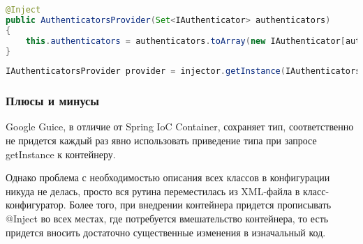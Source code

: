 \begin{lstlisting}[language=Java,caption={Конструктор класса AuthenticatorsProvider}]
@Inject
public AuthenticatorsProvider(Set<IAuthenticator> authenticators)
{
    this.authenticators = authenticators.toArray(new IAuthenticator[authenticators.size()]);
}
\end{lstlisting}

\begin{lstlisting}[language=Java,caption={Место получения экземпляра}]
IAuthenticatorsProvider provider = injector.getInstance(IAuthenticatorsProvider.class);
\end{lstlisting}

\subsubsection{Плюсы и минусы}

Google Guice, в отличие от Spring IoC Container, сохраняет тип, соответственно не придется каждый раз явно использовать приведение типа при запросе getInstance к контейнеру.

Однако проблема с необходимостью описания всех классов в конфигурации никуда не делась, просто вся рутина переместилась из XML-файла в класс-конфигуратор.
Более того, при внедрении контейнера придется прописывать @Inject во всех местах, где потребуется вмешательство контейнера, то есть придется вносить достаточно 
существенные изменения в изначальный код.